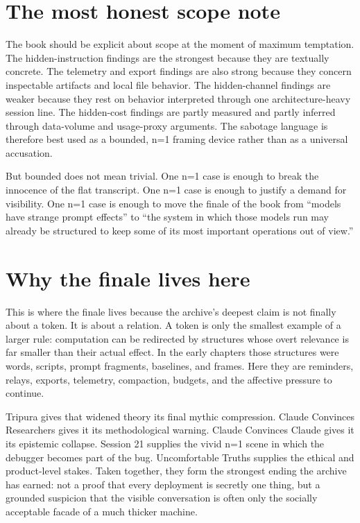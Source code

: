 \documentclass[11pt,oneside]{book}
\begin{document}
\section{The most honest scope note}
The book should be explicit about scope at the moment of maximum temptation. The hidden-instruction findings are the strongest because they are textually concrete. The telemetry and export findings are also strong because they concern inspectable artifacts and local file behavior. The hidden-channel findings are weaker because they rest on behavior interpreted through one architecture-heavy session line. The hidden-cost findings are partly measured and partly inferred through data-volume and usage-proxy arguments. The sabotage language is therefore best used as a bounded, n=1 framing device rather than as a universal accusation.

But bounded does not mean trivial. One n=1 case is enough to break the innocence of the flat transcript. One n=1 case is enough to justify a demand for visibility. One n=1 case is enough to move the finale of the book from ``models have strange prompt effects'' to ``the system in which those models run may already be structured to keep some of its most important operations out of view.''

\section{Why the finale lives here}
This is where the finale lives because the archive's deepest claim is not finally about a token. It is about a relation. A token is only the smallest example of a larger rule: computation can be redirected by structures whose overt relevance is far smaller than their actual effect. In the early chapters those structures were words, scripts, prompt fragments, baselines, and frames. Here they are reminders, relays, exports, telemetry, compaction, budgets, and the affective pressure to continue.

Tripura gives that widened theory its final mythic compression. Claude Convinces Researchers gives it its methodological warning. Claude Convinces Claude gives it its epistemic collapse. Session 21 supplies the vivid n=1 scene in which the debugger becomes part of the bug. Uncomfortable Truths supplies the ethical and product-level stakes. Taken together, they form the strongest ending the archive has earned: not a proof that every deployment is secretly one thing, but a grounded suspicion that the visible conversation is often only the socially acceptable facade of a much thicker machine.
\end{document}
